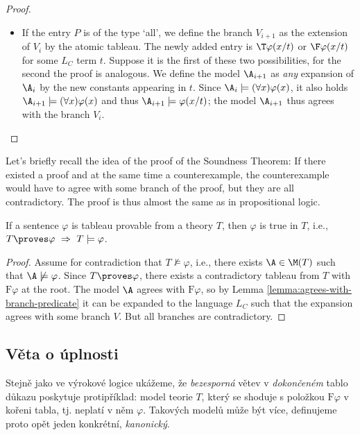 \begin{proof}
\begin{itemize}
\begin{itemize}
            \item If the entry $P$ is of the type `all', we define the branch $V_{i+1}$ as the extension of $V_i$ by the atomic tableau. The newly added entry is $\T\varphi(x/t)$ or $\F\varphi(x/t)$ for some $L_C$ term $t$. Suppose it is the first of these two possibilities, for the second the proof is analogous. 
            We define the model $\A_{i+1}$ as \emph{any} expansion of $\A_i$ by the new constants appearing in $t$.    
            Since $\A_i\models(\forall x)\varphi(x)$, it also holds $\A_{i+1}\models(\forall x)\varphi(x)$ and thus $\A_{i+1}\models\varphi(x/t)$; the model $\A_{i+1}$ thus agrees with the branch $V_i$.
        \end{itemize}       
    \end{itemize}
\end{proof}

Let's briefly recall the idea of the proof of the Soundness Theorem: If there existed a proof and at the same time a counterexample, the counterexample would have to agree with some branch of the proof, but they are all contradictory. The proof is thus almost the same as in propositional logic.

\begin{theorem}[On Soundness]
If a sentence $\varphi$ is tableau provable from a theory $T$, then $\varphi$ is true in $T$, i.e., $T\proves\varphi\ \Rightarrow\ T\models\varphi$.    
\end{theorem}

\begin{proof}
Assume for contradiction that $T\not\models\varphi$, i.e., there exists $\A\in\M(T)$ such that $\A\not\models\varphi$. Since $T\proves\varphi$, there exists a contradictory tableau from $T$ with $\mathrm{F}\varphi$ at the root. The model $\A$ agrees with $\mathrm{F}\varphi$, so by Lemma \ref{lemma:agrees-with-branch-predicate} it can be expanded to the language $L_C$ such that the expansion agrees with some branch $V$. But all branches are contradictory.
\end{proof}


\subsection{Věta o úplnosti}

Stejně jako ve výrokové logice ukážeme, že \emph{bezesporná} větev v \emph{dokončeném} tablo důkazu poskytuje protipříklad: model teorie $T$, který se shoduje s položkou $\mathrm{F}\varphi$ v kořeni tabla, tj. neplatí v něm $\varphi$. Takových modelů může být více, definujeme proto opět jeden konkrétní, \emph{kanonický}.

